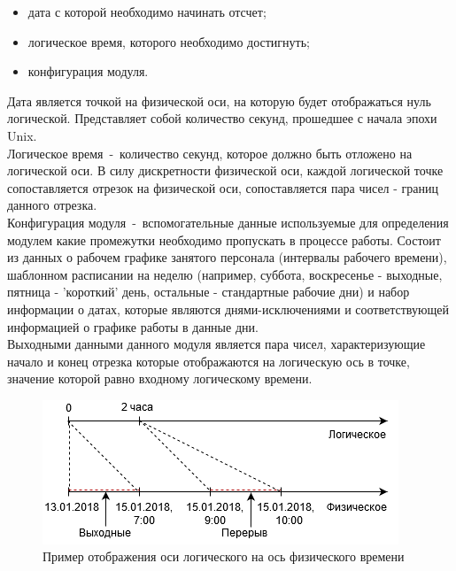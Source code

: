\begin{itemize}
	\item дата с которой необходимо начинать отсчет;
	\item логическое время, которого необходимо достигнуть;
	\item конфигурация модуля.
\end{itemize}

\indent Дата является точкой на физической оси, на которую будет отображаться нуль логической. Представляет собой количество секунд, прошедшее с начала эпохи Unix.\\
\indent Логическое время~-~количество секунд, которое должно быть отложено на логической оси. В силу дискретности физической оси, каждой логической точке сопоставляется отрезок на физической оси, сопоставляется пара чисел - границ данного отрезка.\\
\indent Конфигурация модуля~-~вспомогательные данные используемые для определения модулем какие промежутки необходимо пропускать в процессе работы.
Состоит из данных о рабочем графике занятого персонала (интервалы рабочего времени), шаблонном расписании на неделю (например, суббота, воскресенье - выходные, пятница - 'короткий' день, остальные - стандартные рабочие дни) и набор информации о датах, которые являются днями-исключениями и соответствующей информацией о графике работы в данные дни.\\
\indent Выходными данными данного модуля является пара чисел, характеризующие начало и конец отрезка которые отображаются на логическую ось в точке, значение которой равно входному логическому времени.\\

\begin{figure}[h]
	\includegraphics[width=\linewidth]{pics/scheduleAxes.png}
	\caption{Пример отображения оси логического на ось физического времени}
	\label{fig:axes}
	\centering
\end{figure}

